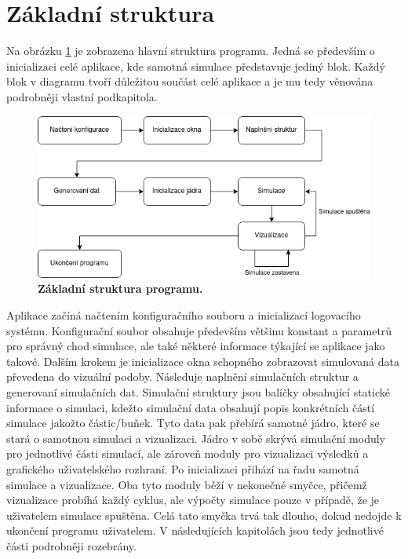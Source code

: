 \section{Základní struktura}
\label{chapter:zakladni_struktura}
Na obrázku \ref{fig:simpleStruct} je zobrazena hlavní struktura programu. Jedná se především o inicializaci celé aplikace, kde samotná simulace představuje jediný blok. Každý blok v diagramu tvoří důležitou součást celé aplikace a je mu tedy věnována podrobněji vlastní podkapitola.

\begin{figure}[hbt]
	\centering
	\captionsetup{justification=centering}
	\includegraphics[scale=0.6]{obrazky-figures/Simple.png}
	\caption{\textbf{Základní struktura programu.}}
	\label{fig:simpleStruct}
\end{figure}

Aplikace začíná načtením konfiguračního souboru a inicializací logovacího systému. Konfigurační soubor obsahuje především většinu konstant a parametrů pro správný chod simulace, ale také některé informace týkající se aplikace jako takové. Dalším krokem je inicializace okna schopného zobrazovat simulovaná data převedena do vizuální podoby. Následuje naplnění simulačních struktur a generovaní simulačních dat. Simulační struktury jsou balíčky obsahující statické informace o simulaci, kdežto simulační data obsahují popis konkrétních částí simulace jakožto částic/buňek. Tyto data pak přebírá samotné jádro, které se stará o samotnou simulaci a vizualizaci. Jádro v sobě skrývá simulační moduly pro jednotlivé části simulací, ale zároveň moduly pro vizualizaci výsledků a grafického uživatelského rozhraní. Po inicializaci přihází na řadu samotná simulace a vizualizace. Oba tyto moduly běží v nekonečné smyčce, přičemž vizualizace probíhá každý cyklus, ale výpočty simulace pouze v případě, že je uživatelem simulace spuštěna. Celá tato smyčka trvá tak dlouho, dokud nedojde k ukončení programu uživatelem. V následujících kapitolách jsou tedy jednotlivé části podrobněji rozebrány. 

